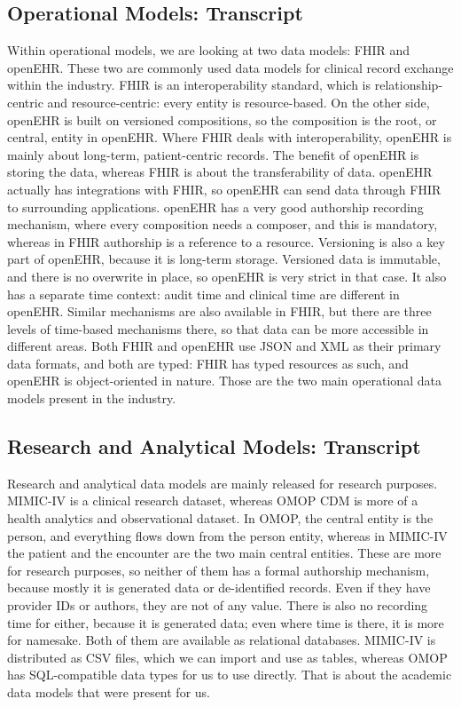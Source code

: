 \documentclass[sigconf]{acmart}
\begin{document}
\subsection{Operational Models: Transcript}
Within operational models, we are looking at two data models: FHIR and
openEHR. These two are commonly used data models for clinical record exchange
within the industry. FHIR is an interoperability standard, which is
relationship-centric and resource-centric: every entity is resource-based. On
the other side, openEHR is built on versioned compositions, so the composition
is the root, or central, entity in openEHR. Where FHIR deals with
interoperability, openEHR is mainly about long-term, patient-centric records.
The benefit of openEHR is storing the data, whereas FHIR is about the
transferability of data. openEHR actually has integrations with FHIR, so
openEHR can send data through FHIR to surrounding applications. openEHR has a
very good authorship recording mechanism, where every composition needs a
composer, and this is mandatory, whereas in FHIR authorship is a reference to
a resource. Versioning is also a key part of openEHR, because it is long-term
storage. Versioned data is immutable, and there is no overwrite in place, so
openEHR is very strict in that case. It also has a separate time context:
audit time and clinical time are different in openEHR. Similar mechanisms are
also available in FHIR, but there are three levels of time-based mechanisms
there, so that data can be more accessible in different areas. Both FHIR and
openEHR use JSON and XML as their primary data formats, and both are typed:
FHIR has typed resources as such, and openEHR is object-oriented in nature.
Those are the two main operational data models present in the industry.

\subsection{Research and Analytical Models: Transcript}
Research and analytical data models are mainly released for research
purposes. MIMIC-IV is a clinical research dataset, whereas OMOP CDM is more of
a health analytics and observational dataset. In OMOP, the central entity is
the person, and everything flows down from the person entity, whereas in
MIMIC-IV the patient and the encounter are the two main central entities.
These are more for research purposes, so neither of them has a formal
authorship mechanism, because mostly it is generated data or de-identified
records. Even if they have provider IDs or authors, they are not of any value.
There is also no recording time for either, because it is generated data; even
where time is there, it is more for namesake. Both of them are available as
relational databases. MIMIC-IV is distributed as CSV files, which we can
import and use as tables, whereas OMOP has SQL-compatible data types for us to
use directly. That is about the academic data models that were present for us.
\end{document}
